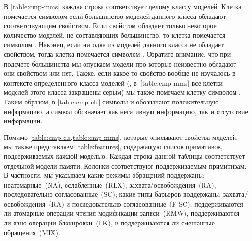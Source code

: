 В \cref{table:cmp-mms} каждая строка соответствует целому классу моделей. 
Клетка помечается символом \cmark\xspace если большинство моделей 
данного класса обладают соответствующим свойством. 
Если свойстом обладает только некоторое количество моделей, 
не составляющих большинство, то клетка помечается символом \wmark\xspace.
Наконец, если ни одна из моделей данного класса не обладает свойством, 
тогда клетка помечается символом \xmark\xspace.
Обратите внимание, что при подсчете большинства 
мы опускаем модели про которые неизвестно обладают 
они свойством или нет. 
Также, если какое-то свойство вообще не изучалось 
в контексте определенного класса моделей 
(\ie, в~\cref{table:cmp-mms} все клетки моделей этого класса закрашены серым)
мы также помечаем клетку символом \xmark. 
Таким образом, в \cref{table:cmp-cls} символы \cmark\xspace и \wmark\xspace 
обозначают положительную информацию, а символ \xmark\xspace обозначает 
как негативную информацию, так и отсутствие информации. 

Помимо \cref{table:cmp-cls,table:cmp-mms}, 
которые описывают свойства моделей, мы также 
представляем \cref{table:features}, содержащую 
список примитивов, поддерживаемых каждой моделью. 
Каждая строка данной таблицы соответствует отдельной модели памяти.
Колонки соответствуют поддерживаемым примитивам. 
В частности, мы указываем какие режимы обращений поддержаны:
неатомарные~(NA), ослабленные~(RLX), захвата/освобождения~(RA), 
последовательно согласованные~(SC); 
какие типы барьеров поддержаны:
захвата/освобождения~(RA) и последовательно согласованные~(F-SC);
поддерживаются ли атомарные операции чтения-модификации-записи~(RMW),
поддерживаются ли явно операции блокировки~(LK),
и поддерживаются ли смешанные обращения~(MIX).   





